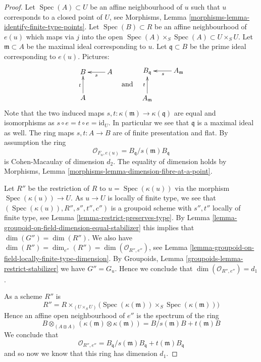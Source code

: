 \documentclass{stacks-project}
\theoremstyle{plain}
\theoremstyle{definition}
\theoremstyle{remark}
\numberwithin{equation}{subsection}
\def\Spec{\mathop{\mathrm{Spec}}}
\begin{document}
\begin{proof}
Let $\Spec(A) \subset U$ be an affine neighbourhood of $u$
such that $u$ corresponds to a closed point of $U$, see
Morphisms, Lemma \ref{morphisms-lemma-identify-finite-type-points}.
Let $\Spec(B) \subset R$ be an affine neighbourhood of $e(u)$
which maps via $j$ into the open
$\Spec(A) \times_S \Spec(A) \subset U \times_S U$.
Let $\mathfrak m \subset A$ be the maximal ideal corresponding to $u$.
Let $\mathfrak q \subset B$ be the prime ideal corresponding to $e(u)$.
Pictures:
$$
\vcenter{
\xymatrix{
B & A \ar[l]^s \\
A \ar[u]^t
}
}
\quad\text{and}\quad
\vcenter{
\xymatrix{
B_{\mathfrak q} & A_{\mathfrak m} \ar[l]^s \\
A_{\mathfrak m} \ar[u]^t
}
}
$$
Note that the two induced maps
$s, t : \kappa(\mathfrak m) \to \kappa(\mathfrak q)$
are equal and isomorphisms as $s \circ e = t \circ e = \text{id}_U$.
In particular we see that $\mathfrak q$
is a maximal ideal as well. The ring maps $s, t : A \to B$ are
of finite presentation and flat. By assumption the ring
$$
\mathcal{O}_{F_u, e(u)} = B_{\mathfrak q}/s(\mathfrak m)B_{\mathfrak q}
$$
is Cohen-Macaulay of dimension $d_2$. The equality of dimension holds by
Morphisms, Lemma \ref{morphisms-lemma-dimension-fibre-at-a-point}.

\medskip\noindent
Let $R''$ be the restriction of $R$ to $u = \Spec(\kappa(u))$
via the morphism $\Spec(\kappa(u)) \to U$.
As $u \to U$ is locally of finite type,
we see that $(\Spec(\kappa(u)), R'', s'', t'', c'')$
is a groupoid scheme with $s'', t''$ locally of finite type, see
Lemma \ref{lemma-restrict-preserves-type}.
By
Lemma \ref{lemma-groupoid-on-field-dimension-equal-stabilizer}
this implies that $\dim(G'') = \dim(R'')$. We also have
$\dim(R'') = \dim_{e''}(R'') = \dim(\mathcal{O}_{R'', e''})$, see
Lemma \ref{lemma-groupoid-on-field-locally-finite-type-dimension}.
By
Groupoids, Lemma \ref{groupoids-lemma-restrict-stabilizer}
we have $G'' = G_u$. Hence we conclude that
$\dim(\mathcal{O}_{R'', e''}) = d_1$.

\medskip\noindent
As a scheme $R''$ is
$$
R'' =
R \times_{(U \times_S U)}
\Big(
\Spec(\kappa(\mathfrak m)) \times_S \Spec(\kappa(\mathfrak m))
\Big)
$$
Hence an affine open neighbourhood of $e''$ is the spectrum of the ring
$$
B \otimes_{(A \otimes A)} (\kappa(\mathfrak m) \otimes \kappa(\mathfrak m))
=
B/s(\mathfrak m)B + t(\mathfrak m)B
$$
We conclude that
$$
\mathcal{O}_{R'', e''} =
B_{\mathfrak q}/s(\mathfrak m)B_{\mathfrak q} + t(\mathfrak m)B_{\mathfrak q}
$$
and so now we know that this ring has dimension $d_1$.


\end{proof}
\end{document}
